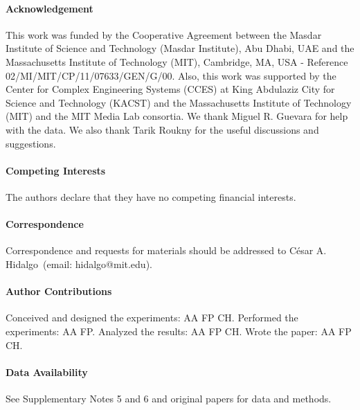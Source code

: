 \documentclass[preprint,superscriptaddress,floatfix]{article}
\begin{document}
\paragraph{Acknowledgement} This work was funded by the Cooperative Agreement between the Masdar Institute of Science and Technology (Masdar Institute), Abu Dhabi, UAE and the Massachusetts Institute of Technology (MIT), Cambridge, MA, USA - Reference 02/MI/MIT/CP/11/07633/GEN/G/00. Also, this work was supported by the Center for Complex Engineering Systems (CCES) at King Abdulaziz City for Science and Technology (KACST) and the Massachusetts Institute of Technology (MIT) and the MIT Media Lab consortia. We thank  Miguel R. Guevara for help with the data. We also thank Tarik Roukny for the useful discussions and suggestions.
\paragraph{Competing Interests} The authors declare that they have no
competing financial interests.
\paragraph{Correspondence} Correspondence and requests for materials
should be addressed to C\'esar A. Hidalgo~(email: hidalgo@mit.edu).

\paragraph{Author Contributions}
Conceived and designed the experiments: AA FP CH. Performed the experiments: AA FP. Analyzed the results: AA FP CH. Wrote the paper: AA FP CH.

\paragraph{Data Availability}
See Supplementary Notes 5 and 6 and original papers \cite{hidalgo2007product,guevara2016research} for data and methods.


%
\end{document}
